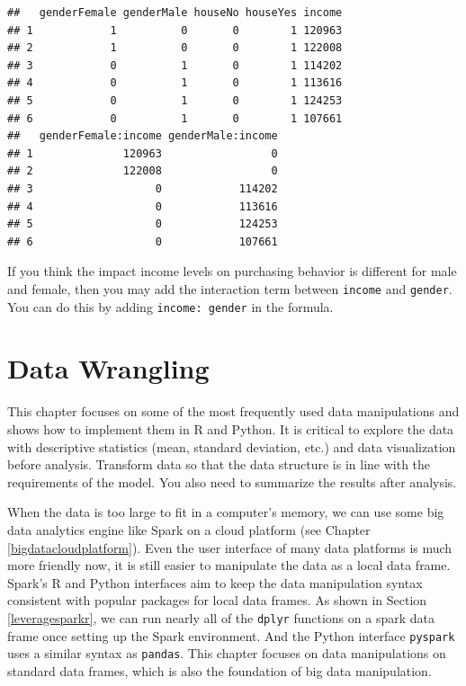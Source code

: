 \documentclass[
  12pt,
]{krantz}
\begin{document}
\begin{verbatim}
##   genderFemale genderMale houseNo houseYes income
## 1            1          0       0        1 120963
## 2            1          0       0        1 122008
## 3            0          1       0        1 114202
## 4            0          1       0        1 113616
## 5            0          1       0        1 124253
## 6            0          1       0        1 107661
##   genderFemale:income genderMale:income
## 1              120963                 0
## 2              122008                 0
## 3                   0            114202
## 4                   0            113616
## 5                   0            124253
## 6                   0            107661
\end{verbatim}

If you think the impact income levels on purchasing behavior is different for male and female, then you may add the interaction term between \texttt{income} and \texttt{gender}. You can do this by adding \texttt{income:\ gender} in the formula.

\hypertarget{datawrangline}{%
\chapter{Data Wrangling}\label{datawrangline}}

This chapter focuses on some of the most frequently used data manipulations and shows how to implement them in R and Python. It is critical to explore the data with descriptive statistics (mean, standard deviation, etc.) and data visualization before analysis. Transform data so that the data structure is in line with the requirements of the model. You also need to summarize the results after analysis.

When the data is too large to fit in a computer's memory, we can use some big data analytics engine like Spark on a cloud platform (see Chapter \ref{bigdatacloudplatform}). Even the user interface of many data platforms is much more friendly now, it is still easier to manipulate the data as a local data frame. Spark's R and Python interfaces aim to keep the data manipulation syntax consistent with popular packages for local data frames. As shown in Section \ref{leveragesparkr}, we can run nearly all of the \texttt{dplyr} functions on a spark data frame once setting up the Spark environment. And the Python interface \texttt{pyspark} uses a similar syntax as \texttt{pandas}. This chapter focuses on data manipulations on standard data frames, which is also the foundation of big data manipulation.
\end{document}
